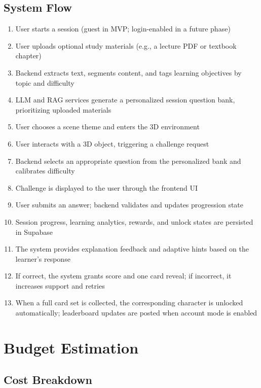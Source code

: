 \documentclass[12pt]{article}
\begin{document}
\subsection{System Flow}

\begin{enumerate}
    \item User starts a session (guest in MVP; login-enabled in a future phase)
    \item User uploads optional study materials (e.g., a lecture PDF or textbook chapter)
    \item Backend extracts text, segments content, and tags learning objectives by topic and difficulty
    \item LLM and RAG services generate a personalized session question bank, prioritizing uploaded materials
    \item User chooses a scene theme and enters the 3D environment
    \item User interacts with a 3D object, triggering a challenge request
    \item Backend selects an appropriate question from the personalized bank and calibrates difficulty
    \item Challenge is displayed to the user through the frontend UI
    \item User submits an answer; backend validates and updates progression state
    \item Session progress, learning analytics, rewards, and unlock states are persisted in Supabase
    \item The system provides explanation feedback and adaptive hints based on the learner's response
    \item If correct, the system grants score and one card reveal; if incorrect, it increases support and retries
    \item When a full card set is collected, the corresponding character is unlocked automatically; leaderboard updates are posted when account mode is enabled
\end{enumerate}

\section{Budget Estimation}

\subsection{Cost Breakdown}
\end{document}

